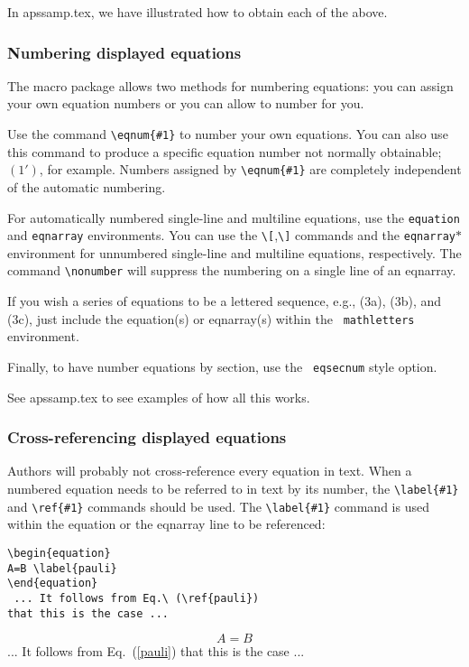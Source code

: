 In apssamp.tex, we have illustrated how to obtain each of the above.

\subsubsection{Numbering displayed equations}

The \REVTeX{} macro package allows two methods for numbering equations: you
can assign your own equation numbers or you can allow \REVTeX{} to number
for you.

Use the command \verb+\eqnum{#1}+ to number your own equations. You can
also use this command to produce a specific equation number not normally
obtainable; $(1')$, for example. Numbers assigned by \verb+\eqnum{#1}+ are
completely independent of the automatic numbering.

For automatically numbered single-line and multiline equations, use the
{\tt equation} and {\tt eqnarray} environments. You can use the
\verb+\[+,\verb+\]+ commands and the {\tt eqnarray$\ast$} environment for
unnumbered single-line and multiline equations, respectively. The command
\verb+\nonumber+ will suppress the numbering on a single line of an
eqnarray.

If you wish a series of equations to be a lettered sequence, e.g., (3a),
(3b), and (3c), just include the equation(s) or eqnarray(s) within the {\tt
mathletters} environment.

Finally, to have \REVTeX{} number equations by section, use the {\tt
eqsecnum} style option.

See apssamp.tex to see examples of how all this works.

\subsubsection{Cross-referencing displayed equations}

Authors will probably not cross-reference every equation in text. When a
numbered equation needs to be referred to in text by its number, the
\verb+\label{#1}+ and \verb+\ref{#1}+ commands should be used. The
\verb+\label{#1}+ command is used within the equation or the eqnarray line
to be referenced:

\smallskip

\begin{verbatim}
\begin{equation}
A=B \label{pauli}
\end{equation}
 ... It follows from Eq.\ (\ref{pauli})
that this is the case ...
\end{verbatim}
\begin{equation}
A=B \label{pauli}
\end{equation}
 ... It follows from Eq.\ (\ref{pauli})  that this
is the case ...


